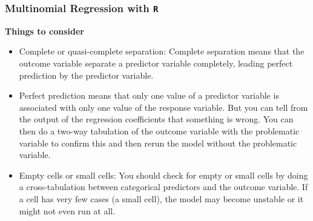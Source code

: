 \documentclass[00-GLMregslides.tex]{subfiles}
\begin{document}
\begin{frame}[fragile]

\frametitle{Multinomial Regression with \texttt{R}}
\Large
\textbf{Things to consider}
\begin{itemize}
\item Complete or quasi-complete separation: Complete separation means that the outcome variable separate a predictor variable completely, leading perfect prediction by the predictor variable.
\item Perfect prediction means that only one value of a predictor variable is associated with only one value of the response variable. But you can tell from the output of the regression coefficients that something is wrong. You can then do a two-way tabulation of the outcome variable with the problematic variable to confirm this and then rerun the model without the problematic variable.
\item Empty cells or small cells: You should check for empty or small cells by doing a cross-tabulation between categorical predictors and the outcome variable. If a cell has very few cases (a small cell), the model may become unstable or it might not even run at all.
\end{itemize}

\end{frame}
\end{document}
